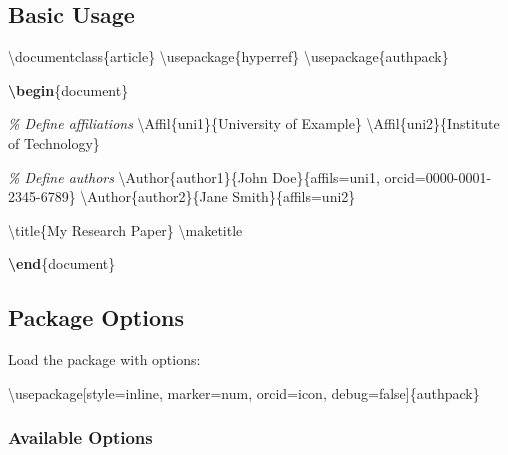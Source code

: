 \documentclass[
]{article}
\newenvironment{Shaded}{}{}
\newcommand{\BuiltInTok}[1]{#1}
\newcommand{\CommentTok}[1]{\textcolor[rgb]{0.38,0.63,0.69}{\textit{#1}}}
\newcommand{\ExtensionTok}[1]{#1}
\newcommand{\FunctionTok}[1]{\textcolor[rgb]{0.02,0.16,0.49}{#1}}
\newcommand{\KeywordTok}[1]{\textcolor[rgb]{0.00,0.44,0.13}{\textbf{#1}}}
\newcommand{\NormalTok}[1]{#1}
\begin{document}
\hypertarget{basic-usage}{%
\subsection{Basic Usage}\label{basic-usage}}

\begin{Shaded}
\begin{Highlighting}[]
\BuiltInTok{\textbackslash{}documentclass}\NormalTok{\{}\ExtensionTok{article}\NormalTok{\}}
\BuiltInTok{\textbackslash{}usepackage}\NormalTok{\{}\ExtensionTok{hyperref}\NormalTok{\}}
\BuiltInTok{\textbackslash{}usepackage}\NormalTok{\{}\ExtensionTok{authpack}\NormalTok{\}}

\KeywordTok{\textbackslash{}begin}\NormalTok{\{}\ExtensionTok{document}\NormalTok{\}}

\CommentTok{\% Define affiliations}
\FunctionTok{\textbackslash{}Affil}\NormalTok{\{uni1\}\{University of Example\}}
\FunctionTok{\textbackslash{}Affil}\NormalTok{\{uni2\}\{Institute of Technology\}}

\CommentTok{\% Define authors}
\FunctionTok{\textbackslash{}Author}\NormalTok{\{author1\}\{John Doe\}\{affils=uni1, orcid=0000{-}0001{-}2345{-}6789\}}
\FunctionTok{\textbackslash{}Author}\NormalTok{\{author2\}\{Jane Smith\}\{affils=uni2\}}

\FunctionTok{\textbackslash{}title}\NormalTok{\{My Research Paper\}}
\FunctionTok{\textbackslash{}maketitle}

\KeywordTok{\textbackslash{}end}\NormalTok{\{}\ExtensionTok{document}\NormalTok{\}}
\end{Highlighting}
\end{Shaded}

\hypertarget{package-options}{%
\subsection{Package Options}\label{package-options}}

Load the package with options:

\begin{Shaded}
\begin{Highlighting}[]
\BuiltInTok{\textbackslash{}usepackage}\NormalTok{[style=inline, marker=num, orcid=icon, debug=false]\{}\ExtensionTok{authpack}\NormalTok{\}}
\end{Highlighting}
\end{Shaded}

\hypertarget{available-options}{%
\subsubsection{Available Options}\label{available-options}}
\end{document}
